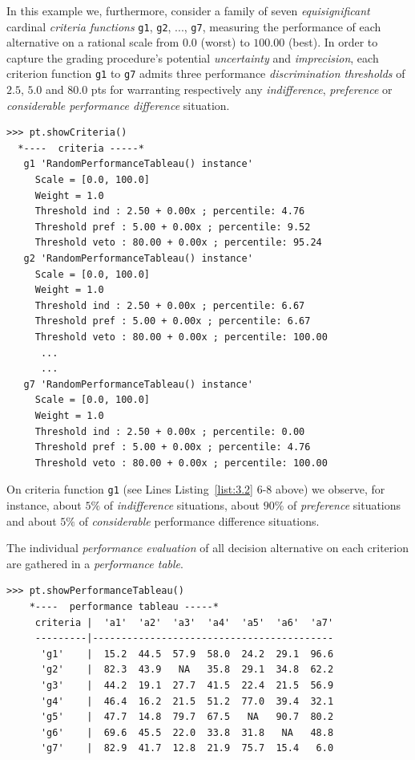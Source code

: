 In this example we, furthermore, consider a family of seven \emph{equisignificant} cardinal \emph{criteria functions} \texttt{g1}, \texttt{g2}, ..., \texttt{g7}, measuring the performance of each alternative on a rational scale from $0.0$ (worst) to $100.00$ (best). In order to capture the grading procedure's potential \emph{uncertainty} and \emph{imprecision}, each criterion function \texttt{g1} to \texttt{g7} admits three performance \emph{discrimination thresholds} of $2.5$, $5.0$ and $80.0$ pts for warranting respectively any \emph{indifference}, \emph{preference} or \emph{considerable performance difference} situation.
\begin{lstlisting}[caption={Inspecting the performance criteria.},label=list:3.2]
>>> pt.showCriteria()
  *----  criteria -----*
   g1 'RandomPerformanceTableau() instance'
     Scale = [0.0, 100.0]
     Weight = 1.0
     Threshold ind : 2.50 + 0.00x ; percentile: 4.76
     Threshold pref : 5.00 + 0.00x ; percentile: 9.52
     Threshold veto : 80.00 + 0.00x ; percentile: 95.24
   g2 'RandomPerformanceTableau() instance'
     Scale = [0.0, 100.0]
     Weight = 1.0
     Threshold ind : 2.50 + 0.00x ; percentile: 6.67
     Threshold pref : 5.00 + 0.00x ; percentile: 6.67
     Threshold veto : 80.00 + 0.00x ; percentile: 100.00
      ...
      ...
   g7 'RandomPerformanceTableau() instance'
     Scale = [0.0, 100.0]
     Weight = 1.0
     Threshold ind : 2.50 + 0.00x ; percentile: 0.00
     Threshold pref : 5.00 + 0.00x ; percentile: 4.76
     Threshold veto : 80.00 + 0.00x ; percentile: 100.00
\end{lstlisting}
On criteria function \texttt{g1} (see Lines Listing~\ref{list:3.2} 6-8 above) we observe, for instance, about $5\%$ of \emph{indifference} situations, about $90\%$ of \emph{preference} situations and about $5\%$ of \emph{considerable} performance difference situations.

The individual \emph{performance evaluation} of all decision alternative on each criterion are gathered in a \emph{performance table}.
\begin{lstlisting}[caption={Inspecting the performance table},label=list:3.3]
>>> pt.showPerformanceTableau()
    *----  performance tableau -----*
     criteria |  'a1'  'a2'  'a3'  'a4'  'a5'  'a6'  'a7'   
     ---------|------------------------------------------
      'g1'    |  15.2  44.5  57.9  58.0  24.2  29.1  96.6  
      'g2'    |  82.3  43.9   NA   35.8  29.1  34.8  62.2  
      'g3'    |  44.2  19.1  27.7  41.5  22.4  21.5  56.9  
      'g4'    |  46.4  16.2  21.5  51.2  77.0  39.4  32.1  
      'g5'    |  47.7  14.8  79.7  67.5   NA   90.7  80.2  
      'g6'    |  69.6  45.5  22.0  33.8  31.8   NA   48.8  
      'g7'    |  82.9  41.7  12.8  21.9  75.7  15.4   6.0  
\end{lstlisting}

